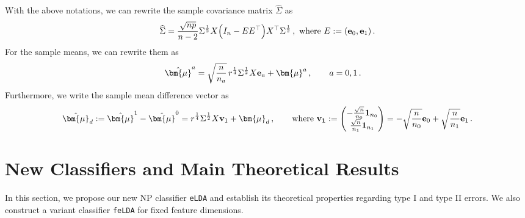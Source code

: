 \documentclass[12pt]{article}
\numberwithin{equation}{section}
\theoremstyle{remark}
\newcommand{\1}{{\rm 1}\kern-0.24em{\rm I}}
\begin{document}
With the above notations, we can rewrite the sample covariance matrix $\widehat \Sigma$ as 
\begin{align} \label{def:hSigma_matrix}
\widehat \Sigma = \frac {\sqrt{np}}{n-2} \Sigma^{\frac 12}{{X}} \Big( I_n - {{E}}{{E}}^{\top}\Big) {{X}}^{\top} \Sigma^{\frac 12}\,,  \text{ where } E:= ({\bf{e}}_0, {\bf{e}}_1)\,. 
\end{align} 
 For the sample means, we can rewrite them as 
\begin{align}
&\hat {\bm{\mu}}^a =\sqrt{ \frac{n}{n_a}}  \, r^{\frac 14}\Sigma^{\frac 12} {X} {\bf e}_a+ {\bm{\mu}}^a\,,  \qquad a=0,1\,.\label{eq:repre_mu_0}
\end{align}
Furthermore, we write the sample mean difference vector as  
\begin{align}\label{eq:repre_mu_d}
\hat {\bm{\mu}}_d := \hat{\bm{\mu}}^1 -\hat{\bm{\mu}}^0
= r^{\frac 14}\Sigma^{\frac 12}{X}  {\bf v}_1 + {\bm{\mu}}_d\,, \qquad \text{where }
{\bf{v}_1}:= \begin{pmatrix}
-\frac{\sqrt n}{{n_0}} {\bf 1}_{n_0}\\
\frac{\sqrt n}{{n_1}} {\bf 1}_{n_1}
\end{pmatrix}= -\sqrt{\frac{n}{n_0}} {\bf e}_0 + \sqrt{\frac{n}{n_1}} {\bf e}_1\,.
\end{align}




\section{New Classifiers and Main Theoretical Results}\label{sec:mainresults}
In this section, we propose our new NP classifier \verb+eLDA+ and establish its theoretical properties regarding type I and type II errors. We also construct a variant classifier  \verb+feLDA+ for fixed feature dimensions.  
\end{document}
